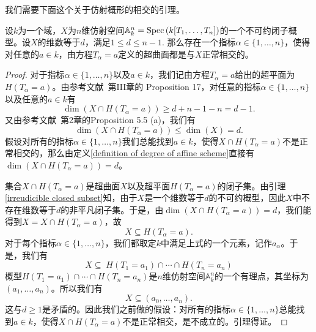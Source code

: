 我们需要下面这个关于仿射概形的相交的引理。
\begin{lemma} \label{intersection with a hyperplane}
设$k$为一个域，$X$为$n$维仿射空间$\mathbb{A}^n_{k} = \operatorname{Spec} \left(k[T_1,\ldots,T_n]\right)$的一个不可约闭子概型。设$X$的维数等于$d$，满足$1 \leqslant d \leqslant n-1.$ 那么存在一个指标$\alpha \in \{1,\ldots,n\}$，使得对任意的$a \in k$，由方程$T_{\alpha} = a$定义的超曲面都是与$X$正常相交的。
\end{lemma}
\begin{proof}
对于指标$\alpha \in \{1,\ldots,n\}$以及$a \in k$，我们记由方程$T_{\alpha} = a$给出的超平面为$H(T_{\alpha} = a)$。由参考文献~第III章的 Proposition 17，对任意的指标$\alpha \in \{1,\ldots,n\}$以及任意的$a \in k$有
\begin{equation}
\dim(X\cap H(T_{\alpha}=a)) \geqslant d+n-1-n = d-1.
\end{equation}
又由参考文献~第2章的Proposition 5.5 (a)，我们有
\begin{equation}
\dim(X\cap H(T_{\alpha}=a)) \leqslant \dim(X) = d.
\end{equation}
假设对所有的指标$\alpha \in \{1,\ldots,n\}$我们总能找到$a \in k$，使得$X \cap H(T_\alpha=a)$不是正常相交的，那么由定义\ref{definition of degree of affine scheme}直接有$\dim(X\cap H(T_{\alpha} = a)) = d$。

集合$X\cap H(T_{\alpha} = a)$是超曲面$X$以及超平面$H(T_{\alpha} = a)$的闭子集。由引理\ref{irreudicible closed subset}知，由于$X$是一个维数等于$d$的不可约概型，因此$X$中不存在维数等于$d$的非平凡闭子集。于是，由$\dim(X\cap H(T_{\alpha} = a)) = d$，我们能得到$X = X\cap H(T_{\alpha} = a)$，故
\begin{equation}
X \subseteq H(T_{\alpha} = a).
\end{equation}
对于每个指标$\alpha \in \{1,\ldots,n\}$，我们都取定$k$中满足上式的一个元素，记作$a_{\alpha}$。于是，我们有
\begin{equation}
X \subseteq \; H(T_1=a_1) \cap \cdots \cap H(T_n=a_n)
\end{equation}
概型$H(T_1=a_1) \cap \cdots \cap H(T_n=a_n)$是$n$维仿射空间$\mathbb{A}^n_{k}$的一个有理点，其坐标为$(a_1,\ldots,a_n)$。所以我们有
\[X\subseteq (a_0,\ldots,a_n).\]
这与$d \geqslant 1$是矛盾的。因此我们之前做的假设：对所有的指标$\alpha \in \{1,\ldots,n\}$总能找到$a \in k$，使得$X \cap H(T_\alpha=a)$不是正常相交，是不成立的。引理得证。
\end{proof}

